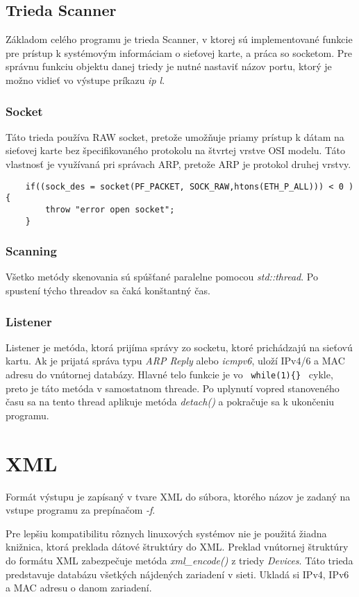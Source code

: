 \documentclass[a4paper, 11pt]{article}
\begin{document}
\subsection{Trieda Scanner}
Základom celého programu je trieda Scanner, v ktorej sú implementované funkcie pre prístup k systé\-movým informáciam o sieťovej karte, a práca so socketom. Pre správnu funkciu objektu danej triedy je nutné nastaviť názov portu, ktorý je možno vidieť vo výstupe príkazu \emph{ip l}. 

\subsubsection{Socket}
Táto trieda používa RAW socket, pretože umožňuje priamy prístup k dátam na sieťovej karte bez špecifi\-kovaného protokolu na štvrtej vrstve OSI modelu. Táto vlastnosť je využívaná pri správach ARP, pretože ARP je protokol druhej vrstvy.

\begin{lstlisting}
    if((sock_des = socket(PF_PACKET, SOCK_RAW,htons(ETH_P_ALL))) < 0 ) {
        throw "error open socket";
    }
\end{lstlisting}

\subsubsection{Scanning}
Všetko metódy skenovania sú spúšťané paralelne pomocou \emph{std::thread}. Po spustení týcho threadov sa čaká konštantný čas.

\subsubsection{Listener}
Listener je metóda, ktorá prijíma správy zo socketu, ktoré prichádzajú na sieťovú kartu. Ak je prijatá správa typu \emph{ARP Reply} alebo \emph{icmpv6}, uloží IPv4/6 a MAC adresu do vnútornej databázy. Hlavné telo funkcie je vo \verb! while(1){} ! cykle, preto je táto metóda v samostatnom threade. Po uplynutí vopred stanoveného času sa na tento thread aplikuje metóda \emph{detach()} a pokračuje sa k ukončeniu programu.

\section{XML}
Formát výstupu je zapísaný v tvare XML do súbora, ktorého názov je zadaný na vstupe programu za prepínačom \emph{-f}.

Pre lepšiu kompatibilitu rôznych linuxových systémov nie je použitá žiadna knižnica, ktorá preklada dátové štruktúry do XML. Preklad vnútornej štruktúry do formátu XML zabezpečuje metóda \emph{xml\_encode()} z triedy \emph{Devices}. Táto trieda predstavuje databázu všetkých nájdených zariadení v sieti. Ukladá si IPv4, IPv6 a MAC adresu o danom zariadení.
\end{document}
